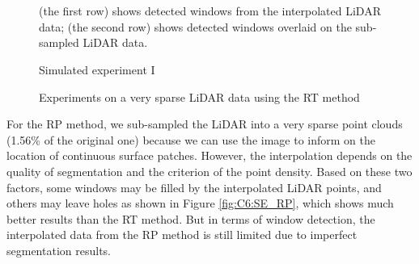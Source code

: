 \begin{figure}[H]
\centering
{} 
\hspace{.1in}
\hspace{.1in}
\hspace{.1in}
 \\

\hspace{.1in}
\hspace{.1in}
\hspace{.1in}
 \\

\caption{Simulated experiment I} {(the first row) shows detected windows from the interpolated LiDAR data; (the second row) shows detected windows overlaid on the sub-sampled LiDAR data.
}
\label{fig:C6:Simulated_Experiments I}
\end{figure} 


\begin{figure}[H]
\centering
{} 
\hspace{.1in}
\caption{Experiments on a very sparse LiDAR data using the RT method} 
\label{fig:C6:Simulated_Experiments I_}
\end{figure} 

For the RP method, we sub-sampled the LiDAR into a very sparse point clouds (1.56\% of the original one) because we can use the image to inform on the location of continuous surface patches. However, the interpolation depends on the quality of segmentation and the criterion of the point density. Based on these two factors, some windows may be filled by the interpolated LiDAR points, and others may leave holes as shown in Figure \ref{fig:C6:SE_RP}, which shows much better results than the RT method. But in terms of window detection, the interpolated data from the RP method is still limited due to  imperfect segmentation results.


